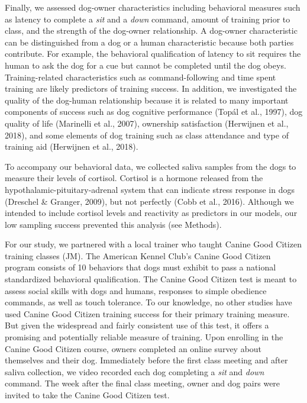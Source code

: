 \documentclass[
  english,
  ,pub,floatsintext]{apa6}
\begin{document}
Finally, we assessed dog-owner characteristics including behavioral measures such as latency to complete a \emph{sit} and a \emph{down} command, amount of training prior to class, and the strength of the dog-owner relationship. A dog-owner characteristic can be distinguished from a dog or a human characteristic because both parties contribute. For example, the behavioral qualification of latency to sit requires the human to ask the dog for a cue but cannot be completed until the dog obeys. Training-related characteristics such as command-following and time spent training are likely predictors of training success. In addition, we investigated the quality of the dog-human relationship because it is related to many important components of success such as dog cognitive performance (Topál et al., 1997), dog quality of life (Marinelli et al., 2007), ownership satisfaction (Herwijnen et al., 2018), and some elements of dog training such as class attendance and type of training aid (Herwijnen et al., 2018).

To accompany our behavioral data, we collected saliva samples from the dogs to measure their levels of cortisol. Cortisol is a hormone released from the hypothalamic-pituitary-adrenal system that can indicate stress response in dogs (Dreschel \& Granger, 2009), but not perfectly (Cobb et al., 2016). Although we intended to include cortisol levels and reactivity as predictors in our models, our low sampling success prevented this analysis (see Methods).

For our study, we partnered with a local trainer who taught Canine Good Citizen training classes (JM). The American Kennel Club's Canine Good Citizen program consists of 10 behaviors that dogs must exhibit to pass a national standardized behavioral qualification. The Canine Good Citizen test is meant to assess social skills with dogs and humans, responses to simple obedience commands, as well as touch tolerance. To our knowledge, no other studies have used Canine Good Citizen training success for their primary training measure. But given the widespread and fairly consistent use of this test, it offers a promising and potentially reliable measure of training. Upon enrolling in the Canine Good Citizen course, owners completed an online survey about themselves and their dog. Immediately before the first class meeting and after saliva collection, we video recorded each dog completing a \emph{sit} and \emph{down} command. The week after the final class meeting, owner and dog pairs were invited to take the Canine Good Citizen test.
\end{document}
